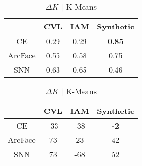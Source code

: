 \begin{table}[ht]
    \centering
    \captionsetup{width=0.9\textwidth}

    \hspace*{-4em}\scalebox{0.75} {
        \begin{subtable}{0.4\linewidth}
            \centering
            \caption{Silhouette Score | K-Means}
            \begin{tabular}{|c|c|c|c|}
            \hline
                & CVL & IAM & Synthetic \\
            \hline
            CE & 0.29 & 0.29 & \textbf{0.85} \\
            ArcFace & 0.55 & 0.58 & 0.75 \\
            SNN & 0.63 & 0.65 & 0.46 \\
            \hline
            \end{tabular}
        \end{subtable}

        \hfill
        \begin{subtable}{0.4\linewidth}
            \centering
            \caption{$\Delta K$ | K-Means}
            \begin{tabular}{|c|c|c|c|}
            \hline
                & CVL & IAM & Synthetic \\
            \hline
            CE & -33 & -38 & \textbf{-2} \\
            ArcFace & 73 & 23 & 42 \\
            SNN & 73 & -68 & 52 \\
            \hline
            \end{tabular}
        \end{subtable}
        
}
\end{table}

